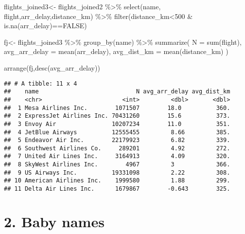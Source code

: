 \documentclass[
]{article}
\newenvironment{Shaded}{\begin{snugshade}}{\end{snugshade}}
\newcommand{\AttributeTok}[1]{\textcolor[rgb]{0.77,0.63,0.00}{#1}}
\newcommand{\ConstantTok}[1]{\textcolor[rgb]{0.00,0.00,0.00}{#1}}
\newcommand{\DecValTok}[1]{\textcolor[rgb]{0.00,0.00,0.81}{#1}}
\newcommand{\FunctionTok}[1]{\textcolor[rgb]{0.00,0.00,0.00}{#1}}
\newcommand{\NormalTok}[1]{#1}
\newcommand{\OtherTok}[1]{\textcolor[rgb]{0.56,0.35,0.01}{#1}}
\newcommand{\SpecialCharTok}[1]{\textcolor[rgb]{0.00,0.00,0.00}{#1}}
\begin{document}
\begin{Shaded}
\begin{Highlighting}[]
\NormalTok{flights\_joined3}\OtherTok{\textless{}{-}}\NormalTok{ flights\_joined2 }\SpecialCharTok{\%\textgreater{}\%}
  \FunctionTok{select}\NormalTok{(name, flight,arr\_delay,distance\_km) }\SpecialCharTok{\%\textgreater{}\%}
  \FunctionTok{filter}\NormalTok{(distance\_km}\SpecialCharTok{\textless{}}\DecValTok{500} \SpecialCharTok{\&} \FunctionTok{is.na}\NormalTok{(arr\_delay)}\SpecialCharTok{==}\ConstantTok{FALSE}\NormalTok{)}

\NormalTok{fj}\OtherTok{\textless{}{-}}\NormalTok{ flights\_joined3 }\SpecialCharTok{\%\textgreater{}\%} 
  \FunctionTok{group\_by}\NormalTok{(name) }\SpecialCharTok{\%\textgreater{}\%} 
  \FunctionTok{summarize}\NormalTok{(}
    \AttributeTok{N =} \FunctionTok{sum}\NormalTok{(flight),}
    \AttributeTok{avg\_arr\_delay =} \FunctionTok{mean}\NormalTok{(arr\_delay),}
    \AttributeTok{avg\_dist\_km =} \FunctionTok{mean}\NormalTok{(distance\_km)}
\NormalTok{  )}

\FunctionTok{arrange}\NormalTok{(fj,}\FunctionTok{desc}\NormalTok{(avg\_arr\_delay))}
\end{Highlighting}
\end{Shaded}

\begin{verbatim}
## # A tibble: 11 x 4
##    name                            N avg_arr_delay avg_dist_km
##    <chr>                       <int>         <dbl>       <dbl>
##  1 Mesa Airlines Inc.        1071507        18.0          360.
##  2 ExpressJet Airlines Inc. 70431260        15.6          373.
##  3 Envoy Air                10207234        11.0          351.
##  4 JetBlue Airways          12555455         8.66         385.
##  5 Endeavor Air Inc.        22179923         6.82         339.
##  6 Southwest Airlines Co.     289201         4.92         272.
##  7 United Air Lines Inc.     3164913         4.09         320.
##  8 SkyWest Airlines Inc.        4967         3            366.
##  9 US Airways Inc.          19331098         2.22         308.
## 10 American Airlines Inc.    1999580         1.88         299.
## 11 Delta Air Lines Inc.      1679867        -0.643        325.
\end{verbatim}

\newpage

\hypertarget{baby-names}{%
\section{2. Baby names}\label{baby-names}}
\end{document}
